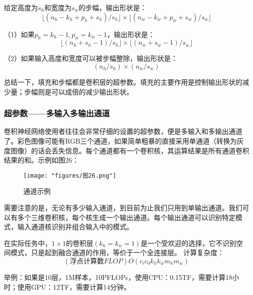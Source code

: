 给定高度为$s_{h}$和宽度为$s_{w}$的步幅，输出形状是：
\begin{equation}\lfloor(n_h-k_h+p_h+s_h)/s_h\rfloor\times\lfloor(n_w-k_w+p_w+s_w)/s_w\rfloor \end{equation}

（1）如果$p_{h}=k_{h}-1 ,p_{w}=k_{w}-1$，输出形状是：
\begin{equation}\lfloor(n_h+s_h-1)/s_h\rfloor\times\lfloor(n_w+s_w-1)/s_w\rfloor \end{equation}

（2）如果输入高度和宽度可以被步幅整除，输出形状是：
\begin{equation}(n_h/s_h)\times(n_w/s_w)\end{equation}

总结一下，填充和步幅都是卷积层的超参数。填充的主要作用是控制输出形状的减少量；步幅则是可以成倍的减少输出形状。

\subsubsection{超参数——多输入多输出通道}
卷积神经网络使用者往往会非常仔细的设置的超参数，便是多输入和多输出通道了。彩色图像可能有RGB三个通道，如果简单粗暴的直接采用单通道（转换为灰度图像）的话会丢失信息。每个通道都有一个卷积核，其运算结果是所有通道卷积结果的和。示例如图26：
\begin{figure}[ht] %
	\centering
	\texttt{[image: "figures/图26.png"]} %
	\caption{通道示例} %
	\label{fig:example} %
\end{figure}

需要注意的是，无论有多少输入通道，到目前为止我们只用到单输出通道。我们可以有多个三维卷积核，每个核生成一个输出通道。每个输出通道可以识别特定模式，输入通道核识别并组合输入中的模式。

在实际任务中，$1\times1$的卷积层$(k_{h}=k_{w}=1)$是一个受欢迎的选择，它不识别空间模式，只是起到融合通道的作用，等价于一个全连接层。
计算复杂度：
\begin{equation}(\text{浮点计算数}FLOP)O(c_ic_0k_hk_wm_hm_w)\end{equation}

举例：如果是10层，1M样本，10PFLOPs，使用CPU：0.15TF，需要计算18小时；使用GPU：12TF，需要计算14分钟。

